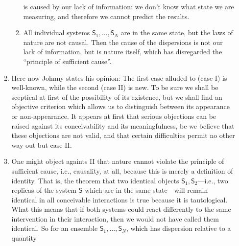 \documentclass[a4paper]{article}
\theoremstyle{definition}
\theoremstyle{plain}
\begin{document}
\begin{enumerate}
\begin{enumerate}
\begin{enumerate}
                        is caused by our lack of
                        information: we don't know what
                        state we are measuring, and
                        therefore we cannot predict the
                        results.
                    \item All individual systems
                        $\mathsf{S}_1,\ldots,\mathsf{S}_N$ 
                        are in the same state, but the
                        laws of nature are not causal.
                        Then the cause of the
                        dispersions is not our lack of
                        information, but is nature
                        itself, which has disregarded
                        the ``principle of sufficient
                        cause''.
                \end{enumerate}
            \item Here now Johnny states his opinion:
                The first case alluded to (case I) is
                well-known, while the second (case II)
                is new. To be sure we shall be sceptical
                at first of the possibility of its
                existence, but we shall find an
                objective criterion which allows us to
                distinguish between its appearance or
                non-appearance. It appears at first that
                serious objections can be raised against
                its conceivability and its
                meaningfulness, be we believe that these
                objections are not valid, and that
                certain difficulties permit no other way
                out but case II.
            \item One might object againts II that nature
                cannot violate the principle of sufficient
                cause, i.e., causality, at all, because this
                is merely a definition of identity. That is,
                the theorem that two identical objects
                $\mathsf{S}_1,\mathsf{S}_2$---i.e., two
                replicas of the system $\mathsf{S}$ which
                are in the same state---will remain
                identical in all conceivable interactions is
                true because it is tautological. What this
                means that if both systems could react
                differently to the same intervention in
                their interaction, then we would not have
                called them identical. So for an ensemble
                $\mathsf{S}_1,\ldots,\mathsf{S}_N$, which
                has dispersion relative to a quantity

\end{enumerate}
\end{enumerate}
\end{document}
